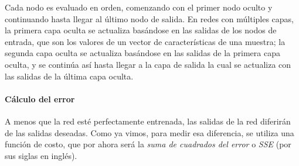 Cada nodo es evaluado en orden, comenzando con el primer nodo oculto
y continuando hasta llegar al último nodo de salida. En 
redes con múltiples capas, la primera capa oculta se actualiza basándose en las
salidas de los nodos de entrada, que son los valores de un vector de características 
de una muestra; la segunda capa oculta se actualiza basándose en las
salidas de la primera capa oculta, y se continúa así hasta llegar a la capa de salida
la cual se actualiza con las salidas de la última capa oculta.

















\paragraph{Cálculo del error}
A menos que la red esté perfectamente entrenada, las salidas de la red diferirán de
las salidas deseadas. Como ya vimos, para medir esa diferencia, se utiliza una función de costo, 
que por ahora será la \textit{suma de cuadrados del error} o \textit{SSE} (por sus 
siglas en inglés).

